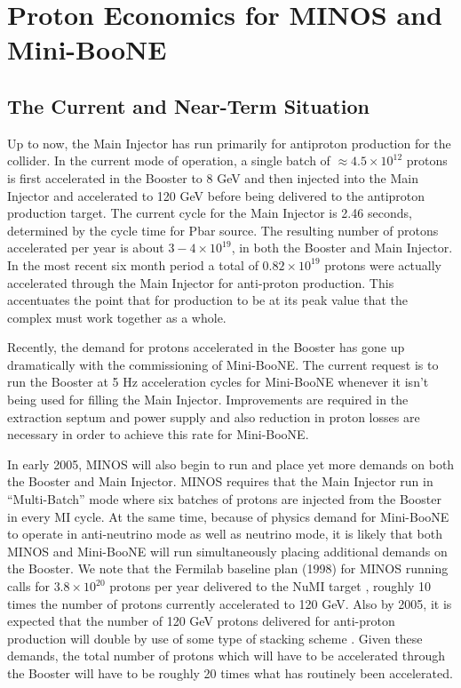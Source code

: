 \documentclass{article}
\begin{document}
\section {Proton Economics for MINOS and Mini-BooNE}
\subsection {The Current and Near-Term Situation}
\label {sec:current}

Up to now, the Main Injector has run primarily
for antiproton production for the collider. In the current mode of operation,
a single batch of $\approx 4.5\times 10^{12}$ protons is first accelerated
in the Booster to 8 GeV and then injected into the Main Injector and
accelerated to 120 GeV before being delivered to the antiproton production
target. The current cycle for the Main Injector is 2.46 seconds, determined by
the cycle time for Pbar source. The resulting
number of protons accelerated per year is about $3-4\times 10^{19}$, in both
the Booster and Main Injector. In the most recent six month period
a total of $0.82\times 10^{19}$ protons were actually accelerated through
the Main Injector for anti-proton production. This accentuates the point that
for production to be at its peak value that the complex must work together
as a whole. 

Recently, the demand for protons
accelerated in the Booster has gone up dramatically with the commissioning
of Mini-BooNE. The current request is to run the Booster at
5 Hz acceleration cycles for Mini-BooNE whenever it isn't being used for
filling the Main Injector. Improvements are required in the extraction
septum and power supply and also reduction in proton losses are necessary
in order to achieve this rate for Mini-BooNE.


In early 2005, MINOS will also begin to run and place yet more
demands on both the Booster and Main Injector. MINOS requires that the 
Main Injector run in ``Multi-Batch'' mode where six batches of protons are
injected from the Booster in every MI cycle. At the same time, because of 
physics demand for Mini-BooNE to operate in anti-neutrino mode as well as
neutrino mode, it is likely that both MINOS and Mini-BooNE 
will run simultaneously
placing additional demands on the Booster. We note that the 
Fermilab baseline plan (1998) for MINOS
running calls for $3.8\times10^{20}$ protons per year 
delivered to the NuMI target \cite {NuMITDR, Peoples}, 
roughly 10 times the number of protons 
currently accelerated to 120 GeV. Also by 2005, it is expected that the
number of 120 GeV protons delivered for
anti-proton production will double by use of some type of stacking scheme
\cite {RunIIB}.
Given these demands, the total number of protons which will have to
be accelerated through the Booster will have to be roughly 20 times what 
has routinely been accelerated. 
\end{document}
